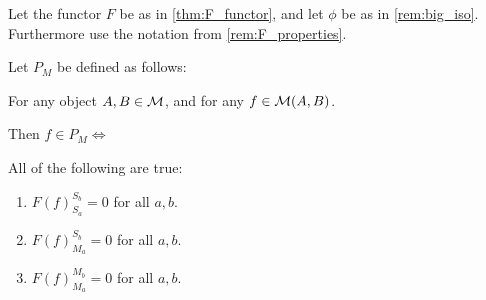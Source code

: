 \begin{definition} \label{def:P_M}
    Let the functor \( F \) be as in \autoref{thm:F_functor}, and let \( \phi \) be as in \autoref{rem:big_iso}. Furthermore use the notation from \autoref{rem:F_properties}.

    Let \( P_M \) be defined as follows:

    For any object \( A, B \in {\mathcal{M}} \), and for any \( f \in {\mathcal{M}}(A, B) \).

    Then \( f \in P_M  \iff \)

    All of the following are true:
    \begin{enumerate}
        \item \( F(f)_{S_a}^{S_b} = 0 \) for all \( a, b \).
        \item \( F(f)_{M_a}^{S_b} = 0 \) for all \( a, b \).
        \item \( F(f)_{M_a}^{M_b} = 0 \) for all \( a, b \).
    \end{enumerate}
\end{definition}

